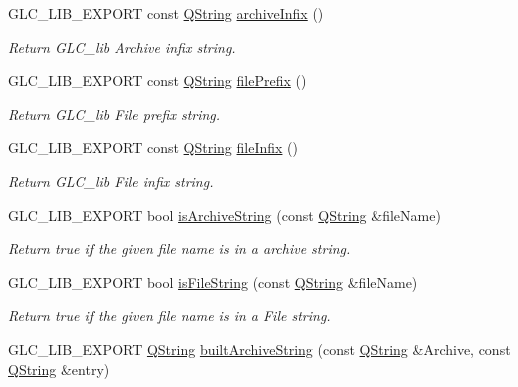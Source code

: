 \begin{DoxyCompactItemize}
G\-L\-C\-\_\-\-L\-I\-B\-\_\-\-E\-X\-P\-O\-R\-T const \hyperlink{group___u_a_v_objects_plugin_gab9d252f49c333c94a72f97ce3105a32d}{Q\-String} \hyperlink{namespaceglc_a7dba69c8657d765b412122ac233e0c8c}{archive\-Infix} ()
\begin{DoxyCompactList}\small\item\em Return G\-L\-C\-\_\-lib Archive infix string. \end{DoxyCompactList}\item 
G\-L\-C\-\_\-\-L\-I\-B\-\_\-\-E\-X\-P\-O\-R\-T const \hyperlink{group___u_a_v_objects_plugin_gab9d252f49c333c94a72f97ce3105a32d}{Q\-String} \hyperlink{namespaceglc_acd6f915ef47adc3418df18bd5f02a1aa}{file\-Prefix} ()
\begin{DoxyCompactList}\small\item\em Return G\-L\-C\-\_\-lib File prefix string. \end{DoxyCompactList}\item 
G\-L\-C\-\_\-\-L\-I\-B\-\_\-\-E\-X\-P\-O\-R\-T const \hyperlink{group___u_a_v_objects_plugin_gab9d252f49c333c94a72f97ce3105a32d}{Q\-String} \hyperlink{namespaceglc_a9203953d91288966d7c2f2ba6a565808}{file\-Infix} ()
\begin{DoxyCompactList}\small\item\em Return G\-L\-C\-\_\-lib File infix string. \end{DoxyCompactList}\item 
G\-L\-C\-\_\-\-L\-I\-B\-\_\-\-E\-X\-P\-O\-R\-T bool \hyperlink{namespaceglc_ade6439982e2a91ba40abd6045ca8abec}{is\-Archive\-String} (const \hyperlink{group___u_a_v_objects_plugin_gab9d252f49c333c94a72f97ce3105a32d}{Q\-String} \&file\-Name)
\begin{DoxyCompactList}\small\item\em Return true if the given file name is in a archive string. \end{DoxyCompactList}\item 
G\-L\-C\-\_\-\-L\-I\-B\-\_\-\-E\-X\-P\-O\-R\-T bool \hyperlink{namespaceglc_a919c4a4ff760467b936da1c293dc6e1f}{is\-File\-String} (const \hyperlink{group___u_a_v_objects_plugin_gab9d252f49c333c94a72f97ce3105a32d}{Q\-String} \&file\-Name)
\begin{DoxyCompactList}\small\item\em Return true if the given file name is in a File string. \end{DoxyCompactList}\item 
G\-L\-C\-\_\-\-L\-I\-B\-\_\-\-E\-X\-P\-O\-R\-T \hyperlink{group___u_a_v_objects_plugin_gab9d252f49c333c94a72f97ce3105a32d}{Q\-String} \hyperlink{namespaceglc_a8e3ebb75d418d278c580453a23d385d0}{built\-Archive\-String} (const \hyperlink{group___u_a_v_objects_plugin_gab9d252f49c333c94a72f97ce3105a32d}{Q\-String} \&Archive, const \hyperlink{group___u_a_v_objects_plugin_gab9d252f49c333c94a72f97ce3105a32d}{Q\-String} \&entry)

\end{DoxyCompactItemize}
